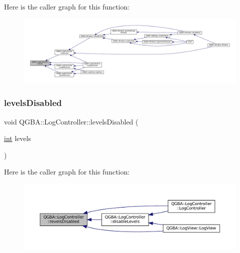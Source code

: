 Here is the caller graph for this function\+:
\nopagebreak
\begin{figure}[H]
\begin{center}
\leavevmode
\includegraphics[width=350pt]{class_q_g_b_a_1_1_log_controller_ac08583e6a38da30e249e8b4854425a54_icgraph}
\end{center}
\end{figure}
\mbox{\label{class_q_g_b_a_1_1_log_controller_a768307fc0e3af09388a3c3b0ff4b9a8e}} 
\subsubsection{\texorpdfstring{levels\+Disabled}{levelsDisabled}}
{\footnotesize\ttfamily void Q\+G\+B\+A\+::\+Log\+Controller\+::levels\+Disabled (\begin{DoxyParamCaption}\item[{\mbox{\hyperlink{ioapi_8h_a787fa3cf048117ba7123753c1e74fcd6}{int}}}]{levels }\end{DoxyParamCaption})\hspace{0.3cm}{\ttfamily [signal]}}

Here is the caller graph for this function\+:
\nopagebreak
\begin{figure}[H]
\begin{center}
\leavevmode
\includegraphics[width=350pt]{class_q_g_b_a_1_1_log_controller_a768307fc0e3af09388a3c3b0ff4b9a8e_icgraph}
\end{center}
\end{figure}
\mbox{\label{class_q_g_b_a_1_1_log_controller_aaf506f4ff2d1925fb1d7a9541de3fc7a}} 
